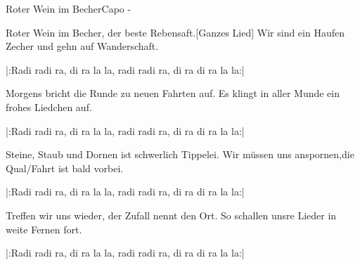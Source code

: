 \begin{song}{Roter Wein im Becher}{}{Capo -}

Roter Wein im Becher, der beste Rebensaft.[Ganzes Lied]
Wir sind ein Haufen Zecher und gehn auf Wanderschaft.

|:Radi radi ra, di ra la la, radi radi ra, di ra di ra la la:|

Morgens bricht die Runde zu neuen Fahrten auf.
Es klingt in aller Munde ein frohes Liedchen auf.

|:Radi radi ra, di ra la la, radi radi ra, di ra di ra la la:|

Steine, Staub und Dornen ist schwerlich Tippelei.
Wir müssen uns anspornen,die Qual/Fahrt ist bald vorbei.

|:Radi radi ra, di ra la la, radi radi ra, di ra di ra la la:|

Treffen wir uns wieder, der Zufall nennt den Ort.
So schallen unsre Lieder in weite Fernen fort.

|:Radi radi ra, di ra la la, radi radi ra, di ra di ra la la:|

\end{song}
